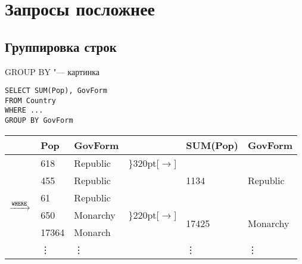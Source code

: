 \section{Запросы посложнее}
\begin{frame}
	\tableofcontents[currentsection]
\end{frame}

\subsection{Группировка строк}

\begin{frame}[fragile]{GROUP BY "--- картинка}
	\begin{center}
		\begin{minipage}{0.4\textwidth}
\begin{verbatim}
SELECT SUM(Pop), GovForm
FROM Country
WHERE ...
GROUP BY GovForm
\end{verbatim}
		\end{minipage}
\vspace{10pt}

		\begin{tabular}{rllcll}
			\hline
			& Pop & GovForm & & SUM(Pop) & GovForm \\\hline
			\multirow{6}{*}{$\xrightarrow{\t{WHERE}}$} & 618 & Republic & \rdelim\}{3}{20pt}[$\longrightarrow$] & \multirow{3}{*}{1134} & \multirow{3}{*}{Republic} \\
			& 455 & Republic & \\
			& 61 & Republic & \\
			& 650 & Monarchy & \rdelim\}{2}{20pt}[$\longrightarrow$] & \multirow{2}{*}{17425} & \multirow{2}{*}{Monarchy} \\
			& 17364 & Monarch & \\
			& \vdots & \vdots & & \vdots & \vdots \\
		\end{tabular}
	\end{center}
\end{frame}

